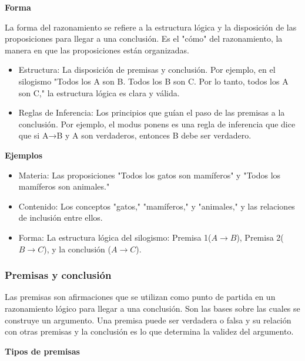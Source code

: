 \textbf{Forma}

La forma del razonamiento se refiere a la estructura lógica y la disposición de las proposiciones para llegar a una conclusión. Es el "cómo" del razonamiento, la manera en que las proposiciones están organizadas.

\begin{itemize}
   \item Estructura: La disposición de premisas y conclusión. Por ejemplo, en el silogismo "Todos los A son B. Todos los B son C. Por lo tanto, todos los A son C," la estructura lógica es clara y válida.
   \item Reglas de Inferencia: Los principios que guían el paso de las premisas a la conclusión. Por ejemplo, el modus ponens es una regla de inferencia que dice que si A→B y A son verdaderos, entonces B debe ser verdadero.
         
\end{itemize}

\textbf{Ejemplos}
\begin{itemize}
   \item Materia: Las proposiciones "Todos los gatos son mamíferos" y "Todos los mamíferos son animales."
   \item Contenido: Los conceptos "gatos," "mamíferos," y "animales," y las relaciones de inclusión entre ellos.
   \item Forma: La estructura lógica del silogismo: Premisa 1($A \rightarrow B$), Premisa 2($B \rightarrow C$), y la conclusión ($A \rightarrow C$).
\end{itemize}

\subsubsection{Premisas y conclusión}

Las premisas son afirmaciones que se utilizan como punto de partida en un razonamiento lógico para llegar a una conclusión. Son las bases sobre las cuales se construye un argumento. Una premisa puede ser verdadera o falsa y su relación con otras premisas y la conclusión es lo que determina la validez del argumento.

\textbf{Tipos de premisas}

